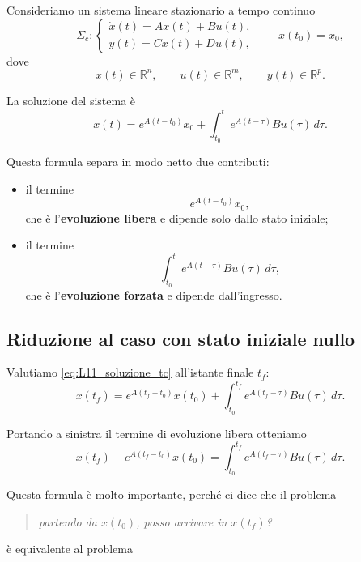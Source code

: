 Consideriamo un sistema lineare stazionario a tempo continuo
\begin{equation}
\Sigma_c:
\begin{cases}
\dot x(t)=Ax(t)+Bu(t),\\
y(t)=Cx(t)+Du(t),
\end{cases}
\qquad x(t_0)=x_0,
\label{eq:L11_sistema_tc}
\end{equation}
dove
\[
x(t)\in\mathbb{R}^n,\qquad
u(t)\in\mathbb{R}^m,\qquad
y(t)\in\mathbb{R}^p.
\]

La soluzione del sistema è
\begin{equation}
x(t)=e^{A(t-t_0)}x_0+\int_{t_0}^{t} e^{A(t-\tau)}Bu(\tau)\,d\tau.
\label{eq:L11_soluzione_tc}
\end{equation}

Questa formula separa in modo netto due contributi:
\begin{itemize}
    \item il termine
    \[
    e^{A(t-t_0)}x_0,
    \]
    che è l'\textbf{evoluzione libera} e dipende solo dallo stato iniziale;
    \item il termine
    \[
    \int_{t_0}^{t} e^{A(t-\tau)}Bu(\tau)\,d\tau,
    \]
    che è l'\textbf{evoluzione forzata} e dipende dall’ingresso.
\end{itemize}

\subsection{Riduzione al caso con stato iniziale nullo}

Valutiamo \eqref{eq:L11_soluzione_tc} all’istante finale \(t_f\):
\begin{equation}
x(t_f)=e^{A(t_f-t_0)}x(t_0)+\int_{t_0}^{t_f} e^{A(t_f-\tau)}Bu(\tau)\,d\tau.
\label{eq:L11_x_tf_tc}
\end{equation}

Portando a sinistra il termine di evoluzione libera otteniamo
\begin{equation}
x(t_f)-e^{A(t_f-t_0)}x(t_0)
=
\int_{t_0}^{t_f} e^{A(t_f-\tau)}Bu(\tau)\,d\tau.
\label{eq:L11_traslazione_tc}
\end{equation}

Questa formula è molto importante, perché ci dice che il problema

\begin{quote}
\emph{partendo da \(x(t_0)\), posso arrivare in \(x(t_f)\)?}
\end{quote}

è equivalente al problema

